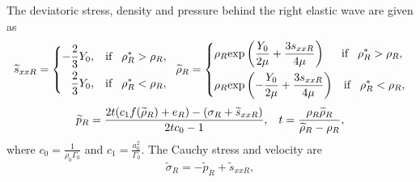 \documentclass[review]{elsarticle}
\begin{document}
%
The deviatoric stress, density and pressure behind the right elastic wave are given as
\begin{equation}
  \widetilde{s}_{xxR} =\left\{ \begin{aligned}
      -\frac{2}{3}Y_0, \hspace{0.3cm} \text{if} \hspace{0.3cm} \rho_R^* > \rho_R,\\
      \frac{2}{3}Y_0, \hspace{0.3cm} \text{if} \hspace{0.3cm} \rho_R^* < \rho_R,\\
    \end{aligned}\right.
    \hspace{0.2cm} \widetilde{\rho}_{R} = \left\{ \begin{aligned}
      & \rho_R \text{exp}\left(\frac{Y_0}{2\mu}+\frac{3 s_{xxR}}{4\mu}\right)  \hspace{0.5cm} \text{if} \hspace{0.3cm} \rho_R^* > \rho_R,\\
& \rho_R \text{exp}\left(-\frac{Y_0}{2\mu}+\frac{3 s_{xxR}}{4\mu}\right)
\hspace{0.3cm} \text{if} \hspace{0.3cm} \rho_R^* < \rho_R,\\
  \end{aligned}\right.
 \end{equation}
\begin{equation}
  \widetilde{p}_R= \frac{2t(c_1f(\widetilde{\rho}_R)+e_R)-(\sigma_R+\widetilde{s}_{xxR})}{2tc_0-1}, \hspace{0.3cm}
t=\frac{\rho_R \widetilde{\rho}_R}{\widetilde{\rho}_R-\rho_R},
\end{equation}
where $c_0 =\frac{1}{\rho_0 \Gamma_0}$ and $c_1 = \frac{a_0^2}{\Gamma_0}$.
The Cauchy stress and velocity are
\begin{equation}
\widetilde{\sigma}_R = -\widetilde{p}_R+\widetilde{s}_{xxR},
\end{equation}
\end{document}
